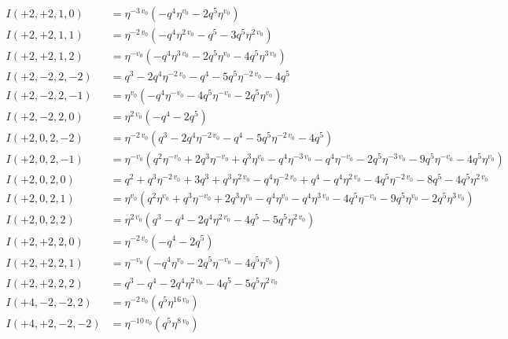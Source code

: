 \documentclass[11pt,a4paper]{article}
\begin{document}
\begin{align*}
I(+2, +2, 1, 0) &= \eta^{-3 \, v_{0}} \left( -q^{4} \eta^{v_{0}} - 2 q^{5} \eta^{v_{0}} \right) \\
I(+2, +2, 1, 1) &= \eta^{-2 \, v_{0}} \left( -q^{4} \eta^{2 \, v_{0}} - q^{5} - 3 q^{5} \eta^{2 \, v_{0}} \right) \\
I(+2, +2, 1, 2) &= \eta^{-v_{0}} \left( -q^{4} \eta^{3 \, v_{0}} - 2 q^{5} \eta^{v_{0}} - 4 q^{5} \eta^{3 \, v_{0}} \right) \\
I(+2, -2, 2, -2) &= q^{3} - 2 q^{4} \eta^{-2 \, v_{0}} - q^{4} - 5 q^{5} \eta^{-2 \, v_{0}} - 4 q^{5} \\
I(+2, -2, 2, -1) &= \eta^{v_{0}} \left( -q^{4} \eta^{-v_{0}} - 4 q^{5} \eta^{-v_{0}} - 2 q^{5} \eta^{v_{0}} \right) \\
I(+2, -2, 2, 0) &= \eta^{2 \, v_{0}} \left( -q^{4} - 2 q^{5} \right) \\
I(+2, 0, 2, -2) &= \eta^{-2 \, v_{0}} \left( q^{3} - 2 q^{4} \eta^{-2 \, v_{0}} - q^{4} - 5 q^{5} \eta^{-2 \, v_{0}} - 4 q^{5} \right) \\
I(+2, 0, 2, -1) &= \eta^{-v_{0}} \left( q^{2} \eta^{-v_{0}} + 2 q^{3} \eta^{-v_{0}} + q^{3} \eta^{v_{0}} - q^{4} \eta^{-3 \, v_{0}} - q^{4} \eta^{-v_{0}} - 2 q^{5} \eta^{-3 \, v_{0}} - 9 q^{5} \eta^{-v_{0}} - 4 q^{5} \eta^{v_{0}} \right) \\
I(+2, 0, 2, 0) &= q^{2} + q^{3} \eta^{-2 \, v_{0}} + 3 q^{3} + q^{3} \eta^{2 \, v_{0}} - q^{4} \eta^{-2 \, v_{0}} + q^{4} - q^{4} \eta^{2 \, v_{0}} - 4 q^{5} \eta^{-2 \, v_{0}} - 8 q^{5} - 4 q^{5} \eta^{2 \, v_{0}} \\
I(+2, 0, 2, 1) &= \eta^{v_{0}} \left( q^{2} \eta^{v_{0}} + q^{3} \eta^{-v_{0}} + 2 q^{3} \eta^{v_{0}} - q^{4} \eta^{v_{0}} - q^{4} \eta^{3 \, v_{0}} - 4 q^{5} \eta^{-v_{0}} - 9 q^{5} \eta^{v_{0}} - 2 q^{5} \eta^{3 \, v_{0}} \right) \\
I(+2, 0, 2, 2) &= \eta^{2 \, v_{0}} \left( q^{3} - q^{4} - 2 q^{4} \eta^{2 \, v_{0}} - 4 q^{5} - 5 q^{5} \eta^{2 \, v_{0}} \right) \\
I(+2, +2, 2, 0) &= \eta^{-2 \, v_{0}} \left( -q^{4} - 2 q^{5} \right) \\
I(+2, +2, 2, 1) &= \eta^{-v_{0}} \left( -q^{4} \eta^{v_{0}} - 2 q^{5} \eta^{-v_{0}} - 4 q^{5} \eta^{v_{0}} \right) \\
I(+2, +2, 2, 2) &= q^{3} - q^{4} - 2 q^{4} \eta^{2 \, v_{0}} - 4 q^{5} - 5 q^{5} \eta^{2 \, v_{0}} \\
I(+4, -2, -2, 2) &= \eta^{-2 \, v_{0}} \left( q^{5} \eta^{16 \, v_{0}} \right) \\
I(+4, +2, -2, -2) &= \eta^{-10 \, v_{0}} \left( q^{5} \eta^{8 \, v_{0}} \right) \\

\end{align*}
\end{document}
